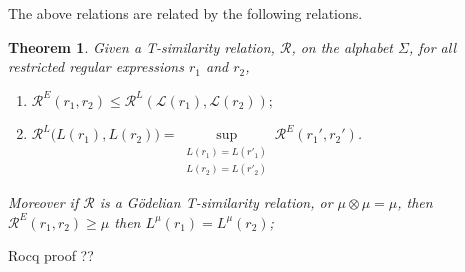 \documentclass{article}
\newcommand{\cR}{{\mathcal R}}
\newtheorem{theorem}{Theorem}[section]
\begin{document}
\noindent The above relations are related by the following relations.
\begin{theorem}\label{thm:Rr-RL-bridge} Given a T-similarity relation, $\cR$, on the alphabet $\Sigma$, for all restricted regular expressions $r_1$ and $r_2$,
\begin{enumerate} 
\item$\mathcal R^E(r_1,r_2)\leq \mathcal R^L(\mathcal L(r_1),\mathcal L(r_2));$

\item$\mathcal{R}^L\bigl(L(r_1),L(r_2)\bigr)=\sup\limits_{\substack{L(r_1)=L(r'_1)\\L(r_2)=L(r'_2)}}\mathcal{R}^E(r_1',r_2')$.

\end{enumerate}
Moreover if $\cR$ is a G\"odelian T-similarity relation, or $\mu\otimes\mu=\mu $, then $\mathcal R^E(r_1,r_2)\geq \mu$ then $L^\mu(r_1)=L^\mu(r_2)$;
\end{theorem}
{\color{red} Rocq proof ??}\vspace{0.5cm}
\end{document}
